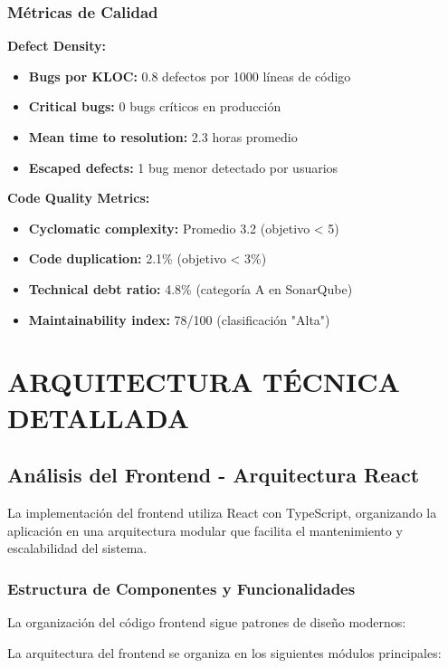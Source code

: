 \documentclass[12pt,a4paper]{report}
\begin{document}
\subsection{Métricas de Calidad}

\textbf{Defect Density:}
\begin{itemize}
\item \textbf{Bugs por KLOC:} 0.8 defectos por 1000 líneas de código
\item \textbf{Critical bugs:} 0 bugs críticos en producción
\item \textbf{Mean time to resolution:} 2.3 horas promedio
\item \textbf{Escaped defects:} 1 bug menor detectado por usuarios
\end{itemize}

\textbf{Code Quality Metrics:}
\begin{itemize}
\item \textbf{Cyclomatic complexity:} Promedio 3.2 (objetivo < 5)
\item \textbf{Code duplication:} 2.1\% (objetivo < 3\%)
\item \textbf{Technical debt ratio:} 4.8\% (categoría A en SonarQube)
\item \textbf{Maintainability index:} 78/100 (clasificación "Alta")
\end{itemize}

\chapter{ARQUITECTURA TÉCNICA DETALLADA}

\section{Análisis del Frontend - Arquitectura React}

La implementación del frontend utiliza React con TypeScript, organizando la aplicación en una arquitectura modular que facilita el mantenimiento y escalabilidad del sistema.

\subsection{Estructura de Componentes y Funcionalidades}

La organización del código frontend sigue patrones de diseño modernos:

La arquitectura del frontend se organiza en los siguientes módulos principales:
\end{document}
